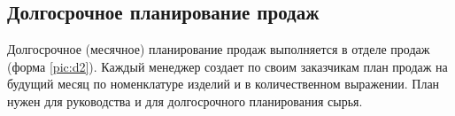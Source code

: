 \newpage
\subsection{Долгосрочное планирование продаж}
\label{bp:monthplan}

Долгосрочное (месячное) планирование продаж выполняется в отделе продаж (форма \ref{pic:d2}).
Каждый менеджер создает по своим заказчикам план продаж на будущий месяц по номенклатуре изделий и в количественном выражении. 
План нужен для руководства и для долгосрочного планирования сырья.







